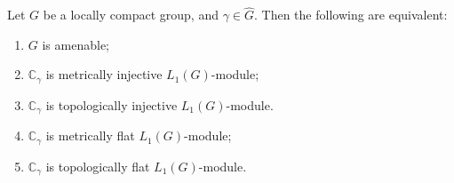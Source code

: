 \begin{proposition}\label{OneDimL1ModMetTopInjFlatCharac} Let $G$ be a locally
compact group, and $\gamma\in\widehat{G}$. Then the following are equivalent:

\begin{enumerate}[label = (\roman*)]
    \item $G$ is amenable;

    \item $\mathbb{C}_\gamma$ is metrically injective $L_1(G)$-module;

    \item $\mathbb{C}_\gamma$ is topologically injective $L_1(G)$-module.

    \item $\mathbb{C}_\gamma$ is metrically flat $L_1(G)$-module;

    \item $\mathbb{C}_\gamma$ is topologically flat $L_1(G)$-module.
\end{enumerate}
\end{proposition}
